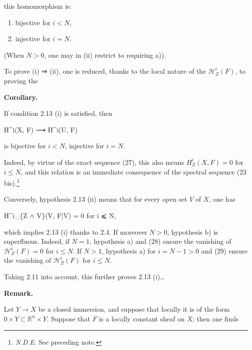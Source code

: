 \documentclass[
  11pt,
  a4paper,
]{book}
\newenvironment{Shaded}{}{}
\newcommand{\NormalTok}[1]{#1}
\begin{document}
this homomorphism is:

\begin{enumerate}
\def\labelenumi{\alph{enumi})}
\item
  bijective for \(i < N\),
\item
  injective for \(i = N\).
\end{enumerate}

(When \(N > 0\), one may in (ii) restrict to requiring a)).

To prove (i) ⇒ (ii), one is reduced, thanks to the local nature of the
\(\mathcal{H}^{i}_{Z}(F)\), to proving the

\textbf{Corollary.}

If condition 2.13 (i) is satisfied, then

\begin{Shaded}
\begin{Highlighting}[]
\NormalTok{H\^{}i(X, F) ⟶ H\^{}i(U, F)}
\end{Highlighting}
\end{Shaded}

is bijective for \(i < N\), injective for \(i = N\).

Indeed, by virtue of the exact sequence (27), this also means
\(H^{i}_{Z}(X, F) = 0\) for \(i \leqslant N\), and this relation is an
immediate consequence of the spectral sequence (23 bis).\footnote{\emph{N.D.E.}
  See preceding note.}

Conversely, hypothesis 2.13 (ii) means that for every open set \(V\) of
\(X\), one has

\begin{Shaded}
\begin{Highlighting}[]
\NormalTok{H\^{}i\_\{Z ∩ V\}(V, F|V) = 0 for i ⩽ N,}
\end{Highlighting}
\end{Shaded}

which implies 2.13 (i) thanks to 2.4. If moreover \(N > 0\), hypothesis
b) is superfluous. Indeed, if \(N = 1\), hypothesis a) and (28) ensure
the vanishing of \(\mathcal{H}^{i}_{Z}(F) = 0\) for \(i \leqslant N\).
If \(N > 1\), hypothesis a) for \(i =
N - 1 > 0\) and (29) ensure the vanishing of \(\mathcal{H}^{i}_{Z}(F)\)
for \(i \leqslant N\).

Taking 2.11 into account, this further proves 2.13 (i)\ldots{}

\textbf{Remark.}

Let \(Y \to X\) be a closed immersion, and suppose that locally it is of
the form \({0} \times Y \subset \mathbb{R}^{n}
\times Y\). Suppose that \(F\) is a locally constant sheaf on \(X\);
then one finds
\end{document}
